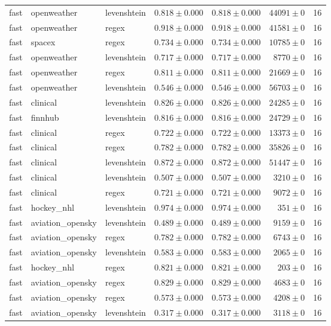 \begin{table}[htbp]
\begin{tabular}{l l l r r r r}
fast & openweather & levenshtein & $0.818\pm0.000$ & $0.818\pm0.000$ & $44091\pm0$ & 16 \\
fast & openweather & regex & $0.918\pm0.000$ & $0.918\pm0.000$ & $41581\pm0$ & 16 \\
fast & spacex & regex & $0.734\pm0.000$ & $0.734\pm0.000$ & $10785\pm0$ & 16 \\
fast & openweather & levenshtein & $0.717\pm0.000$ & $0.717\pm0.000$ & $8770\pm0$ & 16 \\
fast & openweather & regex & $0.811\pm0.000$ & $0.811\pm0.000$ & $21669\pm0$ & 16 \\
fast & openweather & levenshtein & $0.546\pm0.000$ & $0.546\pm0.000$ & $56703\pm0$ & 16 \\
fast & clinical & levenshtein & $0.826\pm0.000$ & $0.826\pm0.000$ & $24285\pm0$ & 16 \\
fast & finnhub & levenshtein & $0.816\pm0.000$ & $0.816\pm0.000$ & $24729\pm0$ & 16 \\
fast & clinical & regex & $0.722\pm0.000$ & $0.722\pm0.000$ & $13373\pm0$ & 16 \\
fast & clinical & regex & $0.782\pm0.000$ & $0.782\pm0.000$ & $35826\pm0$ & 16 \\
fast & clinical & levenshtein & $0.872\pm0.000$ & $0.872\pm0.000$ & $51447\pm0$ & 16 \\
fast & clinical & levenshtein & $0.507\pm0.000$ & $0.507\pm0.000$ & $3210\pm0$ & 16 \\
fast & clinical & regex & $0.721\pm0.000$ & $0.721\pm0.000$ & $9072\pm0$ & 16 \\
fast & hockey\_nhl & levenshtein & $0.974\pm0.000$ & $0.974\pm0.000$ & $351\pm0$ & 16 \\
fast & aviation\_opensky & levenshtein & $0.489\pm0.000$ & $0.489\pm0.000$ & $9159\pm0$ & 16 \\
fast & aviation\_opensky & regex & $0.782\pm0.000$ & $0.782\pm0.000$ & $6743\pm0$ & 16 \\
fast & aviation\_opensky & levenshtein & $0.583\pm0.000$ & $0.583\pm0.000$ & $2065\pm0$ & 16 \\
fast & hockey\_nhl & regex & $0.821\pm0.000$ & $0.821\pm0.000$ & $203\pm0$ & 16 \\
fast & aviation\_opensky & regex & $0.829\pm0.000$ & $0.829\pm0.000$ & $4683\pm0$ & 16 \\
fast & aviation\_opensky & regex & $0.573\pm0.000$ & $0.573\pm0.000$ & $4208\pm0$ & 16 \\
fast & aviation\_opensky & levenshtein & $0.317\pm0.000$ & $0.317\pm0.000$ & $3118\pm0$ & 16 \\

\end{tabular}
\end{table}
